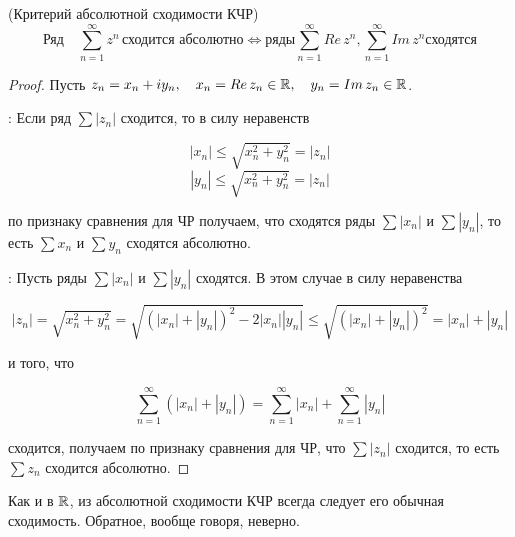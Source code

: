 \documentclass[../../main.tex]{subfiles}
\begin{document}
\begin{thm}(Критерий абсолютной сходимости КЧР)
	\[\text{Ряд} \quad \sum_{n=1}^{\infty}z^n\, \text{сходится абсолютно} \iff 
	\text{ряды} \sum_{n=1}^{\infty}Re\,z^n, \sum_{n=1}^{\infty}Im\,z^n 
	\text{сходятся}\]
\end{thm}
\begin{proof}
	Пусть $ z_n = x_n + iy_n, \quad x_n = Re\,z_n \in \mathbb{R}, \quad y_n = Im\,z_n \in 
	\mathbb{R} $.
	
	\nec: Если ряд $ \sum |z_n| $ сходится, то в силу неравенств
	
	\[|x_n| \leq \sqrt{x_n^2 + y_n^2} = |z_n|\]
	\[|y_n| \leq \sqrt{x_n^2 + y_n^2} = |z_n|\]
	
	по признаку сравнения для ЧР получаем, что сходятся ряды $ \sum |x_n| $ и $ 
	\sum |y_n| $, то есть $ \sum x_n $ и $ \sum y_n $ сходятся абсолютно.
	
	\suff: Пусть ряды $ \sum |x_n| $ и $ \sum |y_n| $ сходятся. В этом случае в 
	силу неравенства
	
	\[|z_n| = \sqrt{x_n^2 + y_n^2} = \sqrt{(|x_n| + |y_n|)^2 - 2|x_n||y_n|} \leq 
	\sqrt{(|x_n| + |y_n|)^2} = |x_n| + |y_n|\]
	
	и того, что
	
	\[\sum_{n=1}^{\infty}(|x_n| + |y_n|) = \sum_{n=1}^{\infty}|x_n| + 
	\sum_{n=1}^{\infty}|y_n|\]
	
	сходится, получаем по признаку сравнения для ЧР, что $ \sum |z_n| $ сходится, 
	то есть  $ \sum z_n $ сходится абсолютно.
\end{proof}

\begin{rem}
	Как и в $ \mathbb{R} $, из абсолютной сходимости КЧР всегда следует его обычная 
	сходимость. Обратное, вообще говоря, неверно.
\end{rem}
\end{document}
